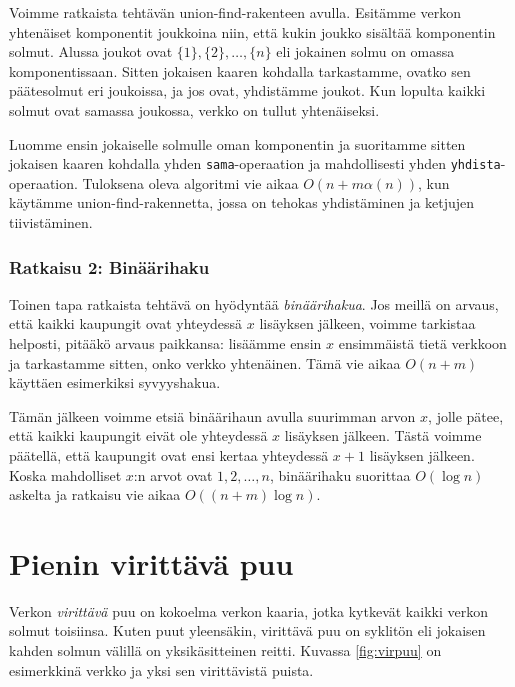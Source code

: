Voimme ratkaista tehtävän union-find-rakenteen avulla.
Esitämme verkon yhtenäiset komponentit joukkoina niin,
että kukin joukko sisältää komponentin solmut.
Alussa joukot ovat $\{1\},\{2\},\dots,\{n\}$
eli jokainen solmu on omassa komponentissaan.
Sitten jokaisen kaaren kohdalla tarkastamme,
ovatko sen päätesolmut eri joukoissa,
ja jos ovat, yhdistämme joukot.
Kun lopulta kaikki solmut ovat samassa joukossa,
verkko on tullut yhtenäiseksi.

Luomme ensin jokaiselle solmulle oman komponentin ja
suoritamme sitten jokaisen kaaren kohdalla yhden
\texttt{sama}-operaation
ja mahdollisesti yhden \texttt{yhdista}-operaation.
Tuloksena oleva algoritmi vie aikaa $O(n+m \alpha(n))$,
kun käytämme union-find-rakennetta, jossa on
tehokas yhdistäminen ja ketjujen tiivistäminen.

\subsubsection{Ratkaisu 2: Binäärihaku}

Toinen tapa ratkaista tehtävä on hyödyntää \emph{binäärihakua}.
Jos meillä on arvaus, että kaikki kaupungit ovat yhteydessä
$x$ lisäyksen jälkeen, voimme tarkistaa helposti,
pitääkö arvaus paikkansa:
lisäämme ensin $x$ ensimmäistä tietä verkkoon ja tarkastamme
sitten, onko verkko yhtenäinen. Tämä vie aikaa $O(n+m)$
käyttäen esimerkiksi syvyyshakua.

Tämän jälkeen voimme etsiä binäärihaun avulla suurimman arvon
$x$, jolle pätee, että kaikki kaupungit eivät ole yhteydessä
$x$ lisäyksen jälkeen. Tästä voimme päätellä, että kaupungit
ovat ensi kertaa yhteydessä $x+1$ lisäyksen jälkeen.
Koska mahdolliset $x$:n arvot ovat $1,2,\ldots,n$,
binäärihaku suorittaa $O(\log n)$ askelta ja ratkaisu vie
aikaa $O((n+m) \log n)$.

\section{Pienin virittävä puu}

Verkon \emph{virittävä} puu on kokoelma verkon kaaria,
jotka kytkevät kaikki verkon solmut toisiinsa.
Kuten puut yleensäkin, virittävä puu on syklitön eli
jokaisen kahden solmun välillä on yksikäsitteinen reitti.
Kuvassa \ref{fig:virpuu} on esimerkkinä verkko ja yksi sen virittävistä puista.

